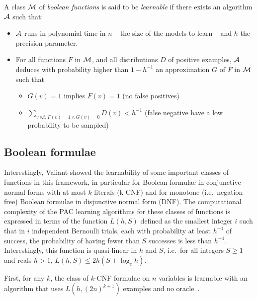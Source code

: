 \documentclass{llncs}
\begin{document}
\begin{definition}
   A class $\cal M$ of \emph{boolean functions} is said to be \emph{learnable}
   if there exists an algorithm $\cal A$ such that:
   \begin{itemize}
      \item $\cal A$ runs in polynomial time in $n$ -- the size of the models to learn -- and $h$ the precision parameter.
      \item
         For all functions $F$ in $\cal M$, and all distributions $D$ of positive examples,
         $\cal A$ deduces with probability higher than $1-h^{-1}$ an approximation $G$ of $F$ in $\cal M$ such that
         \begin{itemize}
            \item $G(v)=1$ implies $F(v)=1$ (no false positives)
            \item
               $\sum_{v\ s.t.\ F(v)=1\wedge G(v)=0} D(v) < h^{-1}$ (false negative have a low probability to be sampled)
         \end{itemize}
   \end{itemize}
\end{definition}


\subsection{Boolean formulae}

Interestingly, Valiant showed the learnability of some important classes of functions in this framework,
in particular for Boolean formulae in conjunctive normal forms with at most $k$ literals (k-CNF)
and for monotone (i.e.~negation free) Boolean formulae in disjunctive normal form (DNF).
The computational complexity of the PAC learning algorithms for these classes of functions is expressed in terms of the function
$L(h,S)$ defined as the smallest integer $i$ such that
in $i$ independent Bernoulli trials, each with probability at least $h^{-1}$ of success, the probability of having fewer than $S$ successes is less than $h^{-1}$.
Interestingly, this function is quasi-linear in $h$ and $S$, i.e.~for all
integers $S\ge 1$ and reals $h>1$, $L(h,S) \le 2h(S+\log_e h)$.

\begin{theorem}\label{thm:kcnf}
First, for any $k$, the class of $k$-CNF formulae on $n$ variables is learnable with an
algorithm that uses $L(h,{(2 n)}^{k+1})$ examples and no oracle~\cite{Valiant84cacm}.
\end{theorem}
\end{document}
